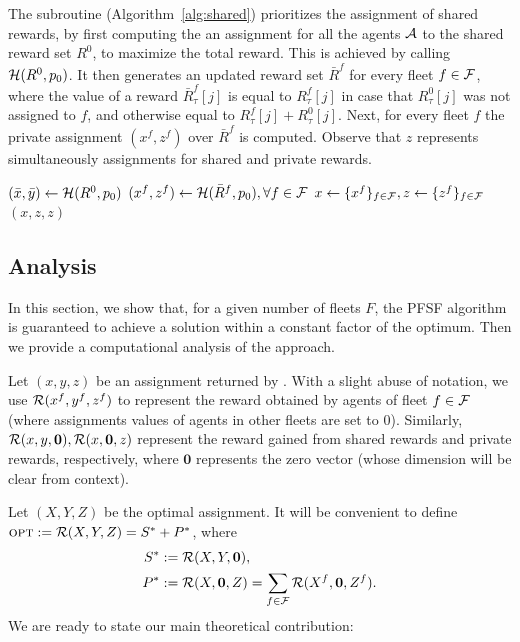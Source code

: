 \documentclass[conference]{IEEEtran}
\begin{document}
The \shared subroutine (Algorithm~\ref{alg:shared}) prioritizes the assignment of shared rewards, by first computing the an assignment for all the agents $\mathcal{A}$ to the shared reward set $R^0$, to maximize the total reward. This is achieved by calling $\mathcal{H}(R^0,p_0)$.  It then generates an updated reward set $\bar{R}^f$ for every fleet $f\in \mathcal{F}$, where the value of a reward $\bar{R}^f_\tau [j]$ is equal to $R^f_\tau [j]$ in case that $R^0_\tau[j]$ was not assigned to $f$, and otherwise equal to $R^f_\tau [j]+R^0_\tau[j]$. Next, for every fleet $f$ the private assignment $(x^f,z^f)$ over $\bar{R}^f$ is computed. Observe that $z$ represents simultaneously assignments for shared and private rewards.

\begin{algorithm}[!ht]
    $(\bar{x},\bar{y})\gets \mathcal{H}(R^0,p_0)$\; 
  $(x^f,z^f)\gets \mathcal{H}(\bar{R}^f,p_0), \forall f\in \mathcal{F}$\;
  $x\gets \{x^f\}_{f\in \mathcal{F}},z\gets\{z^f\}_{f\in \mathcal{F}}$\;
  \Return $(x,z,z)$\;
  \caption{$\shared(\dR,p_0)$}
  \label{alg:shared}
\end{algorithm} 

\subsection{Analysis}
In this section, we show that, for a given number of fleets $F$, the PFSF algorithm is guaranteed to achieve a solution within a constant factor of the optimum. Then we provide a computational analysis of the approach.

Let $(x,y,z)$ be an assignment returned by \alg. With a slight abuse of notation, we use $\mathcal{R}(x^f,y^f,z^f)$ to represent the reward obtained by agents of fleet $f\in \mathcal{F}$ (where assignments values of agents in other fleets are set to $0$). Similarly, $\mathcal{R}(x,y,\bm{0}), \mathcal{R}(x,\bm{0},z)$ represent the reward gained from shared rewards and private rewards, respectively, where $\bm{0}$ represents the zero vector (whose dimension will be clear from context). 

Let $(X,Y,Z)$ be the optimal assignment. It will be convenient to define
$\textsc{opt}:=\mathcal{R}(X,Y,Z)=S^*+P^*$, where 
\begin{align*}S^*&:=\mathcal{R}(X,Y,\bm{0}), \\ P^*&:=\mathcal{R}(X,\bm{0},Z)=\sum_{f\in \mathcal{F}}\mathcal{R}({X}^f,\bm{0},{Z}^f).\end{align*}
We are ready to state our main theoretical contribution:
\end{document}
